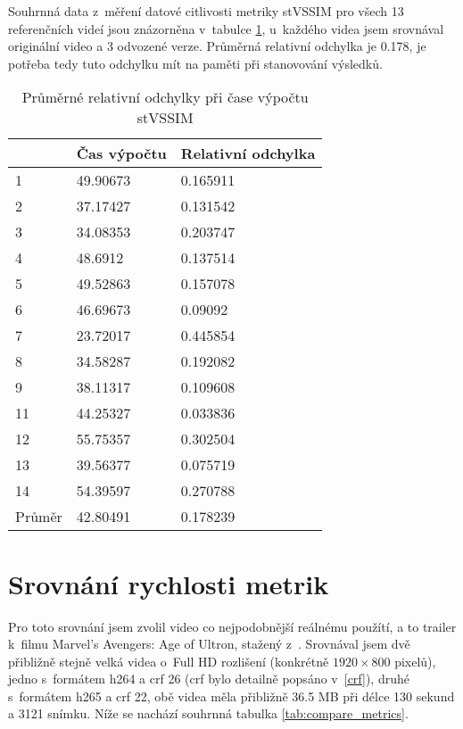 \documentclass[thesis=M,czech]{FITthesis}[2016/06/26]
\begin{document}
Souhrnná data z~měření datové citlivosti metriky stVSSIM pro všech 13 referenčních videí jsou znázorněna v~tabulce \ref{tab:rel_error_stvssim}, u~každého videa jsem srovnával originální video a 3 odvozené verze. Průměrná relativní odchylka je 0.178, je potřeba tedy tuto odchylku mít na paměti při stanovování výsledků.
\begin{table}[]
\centering
\begin{tabular}{|l|l|l|}
\hline
       & Čas výpočtu & Relativní odchylka \\ \hline
1      & 49.90673    & 0.165911           \\ \hline
2      & 37.17427    & 0.131542           \\ \hline
3      & 34.08353    & 0.203747           \\ \hline
4      & 48.6912     & 0.137514           \\ \hline
5      & 49.52863    & 0.157078           \\ \hline
6      & 46.69673    & 0.09092            \\ \hline
7      & 23.72017    & 0.445854           \\ \hline
8      & 34.58287    & 0.192082           \\ \hline
9      & 38.11317    & 0.109608           \\ \hline
11     & 44.25327    & 0.033836           \\ \hline
12     & 55.75357    & 0.302504           \\ \hline
13     & 39.56377    & 0.075719           \\ \hline
14     & 54.39597    & 0.270788           \\ \hline
Průměr & 42.80491    & 0.178239           \\ \hline
\end{tabular}
\caption{Průměrné relativní odchylky při čase výpočtu stVSSIM}
\label{tab:rel_error_stvssim}
\end{table}

\section{Srovnání rychlosti metrik}
Pro toto srovnání jsem zvolil video co nejpodobnější reálnému použítí, a to trailer k~filmu Marvel's Avengers: Age of Ultron, stažený z~\cite{hd_trailers}. Srovnával jsem dvě přibližně stejně velká videa o~Full HD rozlišení (konkrétně $1920 \times 800$ pixelů), jedno s~formátem h264 a crf 26 (crf bylo detailně popsáno v~\autoref{crf}), druhé s~formátem h265 a crf 22, obě videa měla přibližně 36.5 MB při délce 130 sekund a 3121 snímku. Níže se nachází souhrnná tabulka \ref{tab:compare_metrics}.
\end{document}
